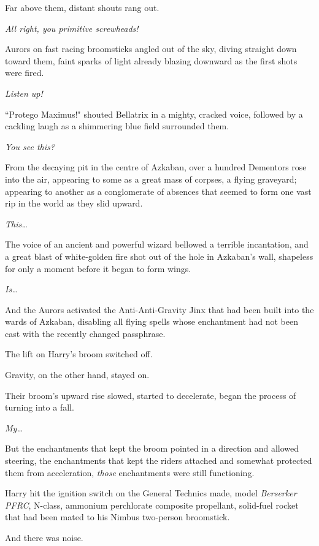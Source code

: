 Far above them, distant shouts rang out.

\emph{All right, you primitive screwheads!}

Aurors on fast racing broomsticks angled out of the sky, diving straight down toward them, faint sparks of light already blazing downward as the first shots were fired.

\emph{Listen up!}

``Protego Maximus!" shouted Bellatrix in a mighty, cracked voice, followed by a cackling laugh as a shimmering blue field surrounded them.

\emph{You see this?}

From the decaying pit in the centre of Azkaban, over a hundred Dementors rose into the air, appearing to some as a great mass of corpses, a flying graveyard; appearing to another as a conglomerate of absences that seemed to form one vast rip in the world as they slid upward.

\emph{This{\ldots}}

The voice of an ancient and powerful wizard bellowed a terrible incantation, and a great blast of white-golden fire shot out of the hole in Azkaban's wall, shapeless for only a moment before it began to form wings.

\emph{Is{\ldots}}

And the Aurors activated the Anti-Anti-Gravity Jinx that had been built into the wards of Azkaban, disabling all flying spells whose enchantment had not been cast with the recently changed passphrase.

The lift on Harry's broom switched off.

Gravity, on the other hand, stayed on.

Their broom's upward rise slowed, started to decelerate, began the process of turning into a fall.

\emph{My{\ldots}}

But the enchantments that kept the broom pointed in a direction and allowed steering, the enchantments that kept the riders attached and somewhat protected them from acceleration, \emph{those} enchantments were still functioning.

\emph{}

Harry hit the ignition switch on the General Technics made, model \emph{Berserker PFRC}, N-class, ammonium perchlorate composite propellant, solid-fuel rocket that had been mated to his Nimbus  two-person broomstick.

And there was noise.

